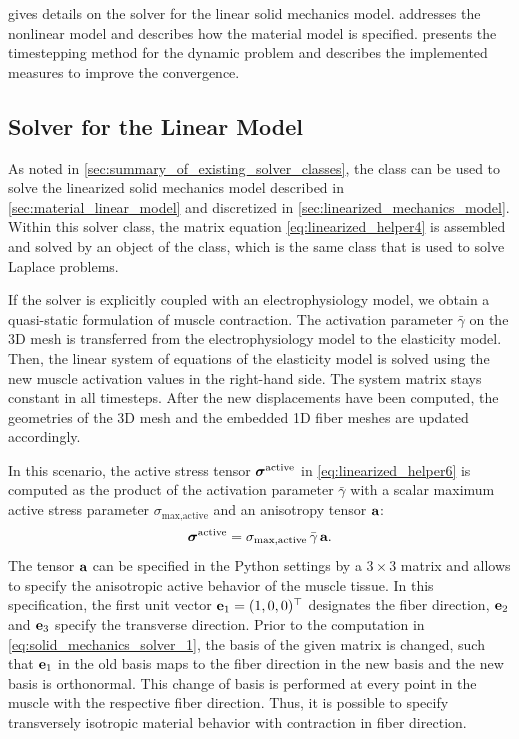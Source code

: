  gives details on the solver for the linear solid mechanics model.  addresses the nonlinear model and describes how the material model is specified.  presents the timestepping method for the dynamic problem and describes the implemented measures to improve the convergence.

\subsection{Solver for the Linear Model}\label{sec:solver_linear_model_elasticity}
As noted in \cref{sec:summary_of_existing_solver_classes}, the  class can be used to solve the linearized solid mechanics model described in \cref{sec:material_linear_model} and discretized in \cref{sec:linearized_mechanics_model}. 
Within this solver class, the matrix equation \cref{eq:linearized_helper4} is assembled and solved by an object of the  class, which is the same class that is used to solve  Laplace problems.

If the solver is explicitly coupled with an electrophysiology model, we obtain a quasi-static formulation of muscle contraction. The activation parameter $\bar{\gamma}$ on the 3D mesh is transferred from the electrophysiology model to the elasticity model.
Then, the linear system of equations of the elasticity model is solved using the new muscle activation values in the right-hand side. The system matrix stays constant in all timesteps. After the new displacements have been computed, the geometries of the 3D mesh and the embedded 1D fiber meshes are updated accordingly.

In this scenario, the active stress tensor $\boldsymbol{\sigma}^\text{active}$ in \cref{eq:linearized_helper6} is computed as the product of the activation parameter $\bar{\gamma}$ with a scalar maximum active stress parameter $\sigma_\text{max,active}$ and an anisotropy tensor $\textbf{a}$:
\begin{align}\label{eq:solid_mechanics_solver_1}
  \boldsymbol{\sigma}^\text{active} = \sigma_\text{max,active} \,\bar{\gamma}\,\textbf{a}.
\end{align}
The tensor $\textbf{a}$ can be specified in the Python settings by a $3 \times 3$ matrix and allows to specify the anisotropic active behavior of the muscle tissue. In this specification, the first unit vector $\textbf{e}_1=(1,0,0)^\top$ designates the fiber direction, $\textbf{e}_2$ and $\textbf{e}_3$ specify the transverse direction. Prior to the computation in \cref{eq:solid_mechanics_solver_1}, the basis of the given matrix is changed, such that $\textbf{e}_1$ in the old basis maps to the fiber direction in the new basis and the new basis is orthonormal. This change of basis is performed at every point in the muscle with the respective fiber direction. Thus, it is possible to specify transversely isotropic material behavior with contraction in fiber direction.

